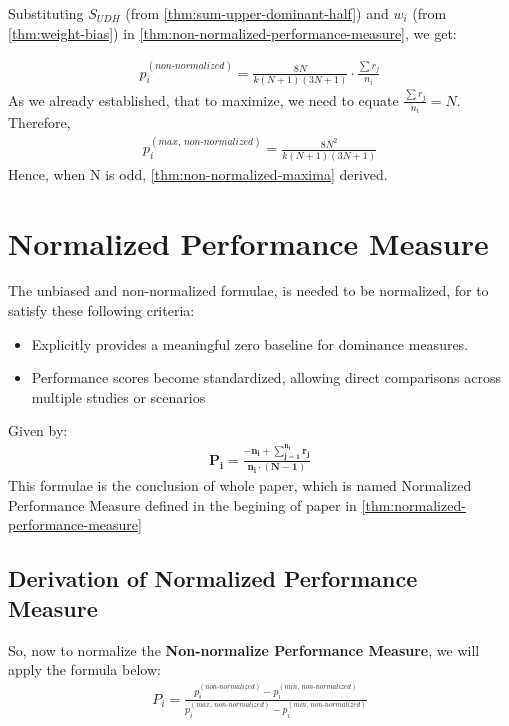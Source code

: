 \documentclass[a4paper,fleqn,review]{cas-sc}
\begin{document}
\begin{enumerate}
	Substituting $S_{UDH}$ (from \autoref{thm:sum-upper-dominant-half}) and $w_i$ (from \autoref{thm:weight-bias}) in \autoref{thm:non-normalized-performance-measure}, 
	we get:
	
	\begin{align*}
		p_i^{(non\text{-}normalized)} = \frac{8N}{k(N+1)(3N+1)} \cdot \frac{\sum r_j}{n_i}
	\end{align*}
	As we already established, that to maximize, we need to equate $\frac{\sum r_j}{n_i} = N$.
	Therefore,
	\begin{align*}
		p_i^{(max, \, non\text{-}normalized)} = \frac{8N^2}{k(N+1)(3N+1)}
	\end{align*}
	Hence, when N is odd, \autoref{thm:non-normalized-maxima} derived.
\end{enumerate}

\section{Normalized Performance Measure}

The unbiased and non-normalized formulae, is needed to be normalized, for to satisfy these following criteria:
\begin{itemize}
	\item Explicitly provides a meaningful zero baseline for dominance measures.
	\item Performance scores become standardized, allowing direct comparisons across multiple studies or scenarios
\end{itemize}
Given by:
\begin{align*}
	\boxed{
		\mathbf{
			P_i = \frac{-n_i +  \sum\limits_{j=1}^{n_i} r_j}{n_i \cdot (N - 1)}}
	}
\end{align*}
This formulae is the conclusion of whole paper, which is named Normalized Performance Measure defined in the begining of paper in \autoref{thm:normalized-performance-measure}

\subsection{Derivation of Normalized Performance Measure}

So, now to normalize the \textbf{Non-normalize Performance Measure}, we will apply the formula below:
\begin{align*}
	P_i = \frac{p_i^{(non\text{-}normalized)} - p_i^{(min, \, non\text{-}normalized)}}{p_i^{(max, \, non\text{-}normalized)} - p_i^{(min, \, non\text{-}normalized)}}
	\label{eq:normalized-simpler}
\end{align*}
\end{document}
